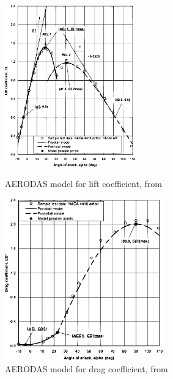 \begin{figure}[!htb]
	\centering
	\begin{minipage}{0.45\textwidth}
		\centering
		\includegraphics[height=7cm]{Figures/background/aero/liftmodel_aerodas.eps}
		\caption{AERODAS model for lift coefficient, from \cite{spera_models_2008}}
		\label{fig:aerodas_cl_model}
	\end{minipage}
	\hfill
    \begin{minipage}{0.45\textwidth}
		\centering
		\includegraphics[height=7cm]{Figures/background/aero/dragmodel_aerodas.eps}
		\caption{AERODAS model for drag coefficient, from \cite{spera_models_2008}}
		\label{fig:aerodas_cd_model}
	\end{minipage}
\end{figure}

